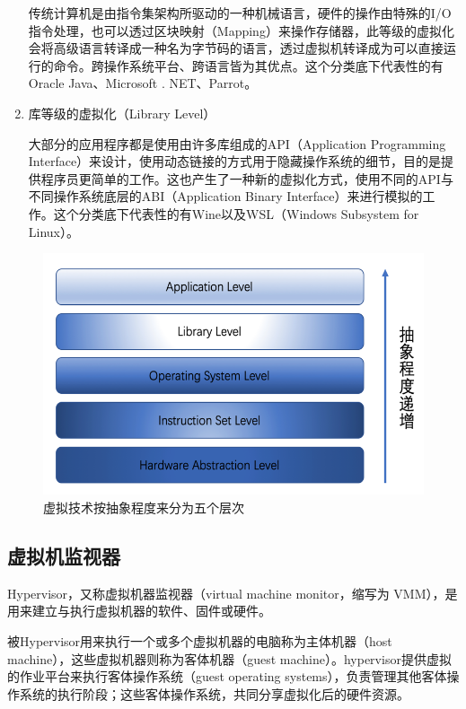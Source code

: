 \begin{enumerate}
    传统计算机是由指令集架构所驱动的一种机械语言，硬件的操作由特殊的I/O指令处理，也可以透过区块映射（Mapping）来操作存储器，此等级的虚拟化会将高级语言转译成一种名为字节码的语言，透过虚拟机转译成为可以直接运行的命令。跨操作系统平台、跨语言皆为其优点。这个分类底下代表性的有Oracle Java、Microsoft . NET、Parrot。
    \item 库等级的虚拟化（Library Level）

    大部分的应用程序都是使用由许多库组成的API（Application Programming Interface）来设计，使用动态链接的方式用于隐藏操作系统的细节，目的是提供程序员更简单的工作。这也产生了一种新的虚拟化方式，使用不同的API与不同操作系统底层的ABI（Application Binary Interface）来进行模拟的工作。这个分类底下代表性的有Wine以及WSL（Windows Subsystem for Linux）。
\end{enumerate}

\begin{figure}[ht]
  \centering
  \includegraphics{./Figure/IMG_Chap2_1.png}
  \caption{虚拟技术按抽象程度来分为五个层次}\label{Fig:chap2_1}
\end{figure}

\subsection{虚拟机监视器}
Hypervisor，又称虚拟机器监视器（virtual machine monitor，缩写为 VMM），是用来建立与执行虚拟机器的软件、固件或硬件。

被Hypervisor用来执行一个或多个虚拟机器的电脑称为主体机器（host machine），这些虚拟机器则称为客体机器（guest machine）。hypervisor提供虚拟的作业平台来执行客体操作系统（guest operating systems），负责管理其他客体操作系统的执行阶段；这些客体操作系统，共同分享虚拟化后的硬件资源。

